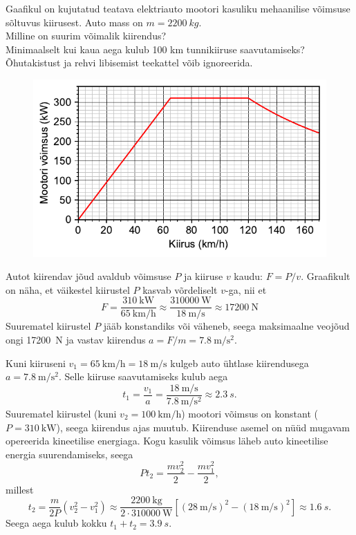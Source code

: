 
Gaafikul on kujutatud teatava elektriauto mootori kasuliku mehaanilise võimsuse sõltuvus kiirusest. Auto mass on $m=\SI{2200}{kg}$.\\
\osa Milline on suurim võimalik kiirendus?\\
\osa Minimaalselt kui kaua aega kulub 100 km tunnikiiruse saavutamiseks?\\
Õhutakistust ja rehvi libisemist teekattel võib ignoreerida.


\begin{figure}[h]
    \centering
    \vspace{-10pt}
    \includegraphics[width=0.75\linewidth]{2023-lahg-05-yl.pdf}
    \vspace{-35pt}
\end{figure}




\hint

\solu
\osa Autot kiirendav jõud avaldub võimsuse $P$ ja kiiruse $v$ kaudu: $F=P/v$. Graafikult on näha, et väikestel kiirustel $P$ kasvab võrdeliselt $v$-ga, nii et
\[
F=\frac{\SI{310}{\kilo\watt}}{\SI{65}{\kilo\meter\per\hour}}
\approx\frac{\SI{310000}{\watt}}{\SI{18}{\meter\per\second}}\approx\SI{17200}{\newton}
\]
Suurematel kiirustel $P$ jääb konstandiks või väheneb, seega maksimaalne veojõud ongi \SI{17200}{N} ja vastav kiirendus $a=F/m=\SI{7.8}{\meter\per\second\squared}$.

\osa Kuni kiiruseni $v_1=\SI{65}{\kilo\meter\per\hour}=\SI{18}{\meter\per\second}$ kulgeb auto ühtlase kiirendusega $a=\SI{7.8}{\meter\per\second\squared}$. Selle kiiruse saavutamiseks kulub aega
\[
t_1=\frac{v_1}{a}= \frac{\SI{18}{\meter\per\second}}{\SI{7.8}{\meter\per\second\squared}} \approx \SI{2.3}{s}.
\]
Suurematel kiirustel (kuni $v_2=\SI{100}{\kilo\meter\per\hour}$) mootori võimsus on konstant ($P=\SI{310}{\kilo\watt}$), seega kiirendus ajas muutub. Kiirenduse asemel on nüüd mugavam opereerida kineetilise energiaga. Kogu kasulik võimsus läheb auto kineetilise energia suurendamiseks, seega
\[
Pt_2=\frac{mv_2^2}{2} - \frac{mv_1^2}{2},
\]
millest
\[
t_2=\frac{m}{2P}(v_2^2-v_1^2)\approx \frac{\SI{2200}{\kilo\gram}}{2\cdot \SI{310000}{\watt}}\left[(\SI{28}{\meter\per\second})^2 - (\SI{18}{\meter\per\second})^2 \right]\approx \SI{1.6}{s}.
\]
Seega aega kulub kokku $t_1+t_2=\SI{3.9}{s}$.
\probend